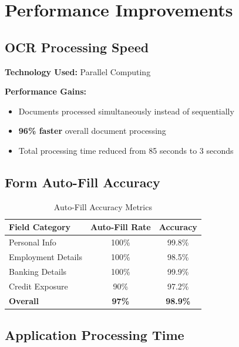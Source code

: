 \documentclass[12pt,a4paper]{article}
\begin{document}
\section{Performance Improvements}

\subsection{OCR Processing Speed}

\textbf{Technology Used:} Parallel Computing

\textbf{Performance Gains:}
\begin{itemize}
    \item Documents processed simultaneously instead of sequentially
    \item \textbf{96\% faster} overall document processing
    \item Total processing time reduced from 85 seconds to 3 seconds
\end{itemize}

\subsection{Form Auto-Fill Accuracy}

\begin{table}[h]
\centering
\begin{tabular}{@{}lcc@{}}
\toprule
\textbf{Field Category} & \textbf{Auto-Fill Rate} & \textbf{Accuracy} \\ \midrule
Personal Info & 100\% & 99.8\% \\
Employment Details & 100\% & 98.5\% \\
Banking Details & 100\% & 99.9\% \\
Credit Exposure & 90\% & 97.2\% \\
\textbf{Overall} & \textbf{97\%} & \textbf{98.9\%} \\ \bottomrule
\end{tabular}
\caption{Auto-Fill Accuracy Metrics}
\end{table}

\subsection{Application Processing Time}
\end{document}
